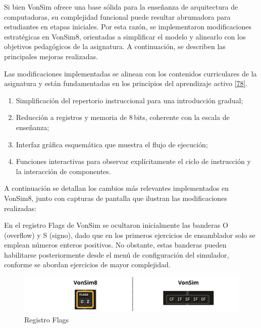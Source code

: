 \documentclass[12pt,oneside]{templates/unerthesis}
\providecommand{\tightlist}{%
  \setlength{\itemsep}{0pt}\setlength{\parskip}{0pt}}
\begin{document}
Si bien VonSim ofrece una base sólida para la enseñanza de arquitectura de computadoras, su complejidad funcional puede resultar abrumadora para estudiantes en etapas iniciales. Por esta razón, se implementaron modificaciones estratégicas en VonSim8, orientadas a simplificar el modelo y alinearlo con los objetivos pedagógicos de la asignatura. A continuación, se describen las principales mejoras realizadas.

Las modificaciones implementadas se alinean con los contenidos curriculares de la asignatura y están fundamentadas en los principios del aprendizaje activo \protect\hyperlink{ref-bonwell1991active}{{[}78{]}}.

\begin{enumerate}
\def\labelenumi{\arabic{enumi}.}
\tightlist
\item
  Simplificación del repertorio instruccional para una introducción gradual;
\item
  Reducción a registros y memoria de 8\,bits, coherente con la escala de enseñanza;
\item
  Interfaz gráfica esquemática que muestra el flujo de ejecución;
\item
  Funciones interactivas para observar explícitamente el ciclo de instrucción y la interacción de componentes.
\end{enumerate}

A continuación se detallan los cambios más relevantes implementados en VonSim8, junto con capturas de pantalla que ilustran las modificaciones realizadas:

En el registro Flags de VonSim se ocultaron inicialmente las banderas O (overflow) y S (signo), dado que en los primeros ejercicios de ensamblador solo se emplean números enteros positivos. No obstante, estas banderas pueden habilitarse posteriormente desde el menú de configuración del simulador, conforme se abordan ejercicios de mayor complejidad.

\begin{figure}

{\centering \includegraphics[width=1\linewidth]{images/flags} 

}

\caption{Registro Flags}\label{fig:banderas}
\end{figure}
\end{document}
